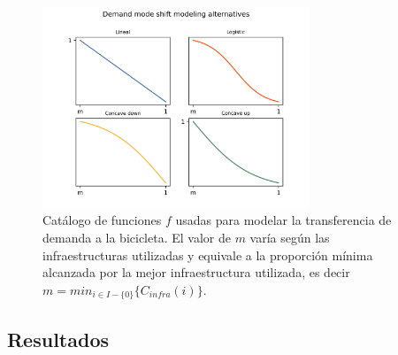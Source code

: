 \documentclass{article}
\begin{document}
  \begin{figure}[h!]
    \centering
    \includegraphics[width=8cm]{../resources/f_catalog.png}
      \caption{Catálogo de funciones $f$ usadas para modelar la transferencia de demanda a la bicicleta. El valor de $m$ varía según las infraestructuras utilizadas y equivale a la proporción mínima alcanzada por la mejor infraestructura utilizada, es decir $m = min_{i \in I - \{0\}} \{ C_{infra}(i) \}$.}
    \label{fig:fcatalog}
  \end{figure}

  \subsection{Resultados}
\end{document}
